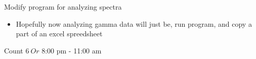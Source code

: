 \documentclass[idxtotoc,hyperref,openany,oneside]{labbook} %
\newcommand{\cmark}{\ding{51}}%
\newcommand{\done}{\rlap{$\square$}{\raisebox{2pt}{\large\hspace{1pt}\cmark}}%
  \hspace{-2.5pt}}
\begin{document}
\begin{todolist}
\item[\done]{Modify program for analyzing spectra}
  \begin{itemize}
  \item{Hopefully now analyzing gamma data will just be,
    run program, and copy a part of an excel spreedsheet}
  \end{itemize}
\end{todolist}






\begin{todolist}
\item[\done]{Count $\boxed{6\ Or}$ 8:00 pm - 11:00 am}
\end{todolist}
\end{document}
